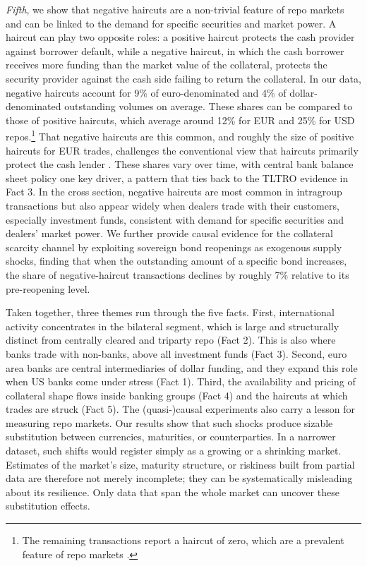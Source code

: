 \documentclass[english, 12pt, oneside]{article}
\begin{document}
\emph{Fifth}, we show that negative haircuts are a non-trivial feature of repo markets and can be linked to the demand for specific securities and market power. A haircut can play two opposite roles: a positive haircut protects the cash provider against borrower default, while a negative haircut, in which the cash borrower receives more funding than the market value of the collateral, protects the security provider against the cash side failing to return the collateral. In our data, negative haircuts account for 9\% of euro-denominated and 4\% of dollar-denominated outstanding volumes on average. These shares can be compared to those of positive haircuts, which average around 12\% for EUR and 25\% for USD repos.\footnote{The remaining transactions report a haircut of zero, which are a prevalent feature of repo markets \citep[see e.g.,][]{julliard2022, hempel2023}.} That negative haircuts are this common, and roughly the size of positive haircuts for EUR trades, challenges the conventional view that haircuts primarily protect the cash lender \citep[see][]{gorton2010, krishnamurthy2014, copeland2014}. These shares vary over time, with central bank balance sheet policy one key driver, a pattern that ties back to the TLTRO evidence in Fact 3.
In the cross section, negative haircuts are most common in intragroup transactions but also appear widely when dealers trade with their customers, especially investment funds, consistent with demand for specific securities and dealers' market power. We further provide causal evidence for the collateral scarcity channel by exploiting sovereign bond reopenings as exogenous supply shocks, finding that when the outstanding amount of a specific bond increases, the share of negative-haircut transactions declines by roughly 7\% relative to its pre-reopening level.

Taken together, three themes run through the five facts. First, international activity concentrates in the bilateral segment, which is large and structurally distinct from centrally cleared and triparty repo (Fact 2). This is also where banks trade with non-banks, above all investment funds (Fact 3). Second, euro area banks are central intermediaries of dollar funding, and they expand this role when US banks come under stress (Fact 1). Third, the availability and pricing of collateral shape flows inside banking groups (Fact 4) and the haircuts at which trades are struck (Fact 5). The (quasi-)causal experiments also carry a lesson for measuring repo markets. Our results show that such shocks produce sizable substitution between currencies, maturities, or counterparties. In a narrower dataset, such shifts would register simply as a growing or a shrinking market.
Estimates of the market's size, maturity structure, or riskiness built from partial data are therefore not merely incomplete; they can be systematically misleading about its resilience.
Only data that span the whole market can uncover these substitution effects.
\end{document}
